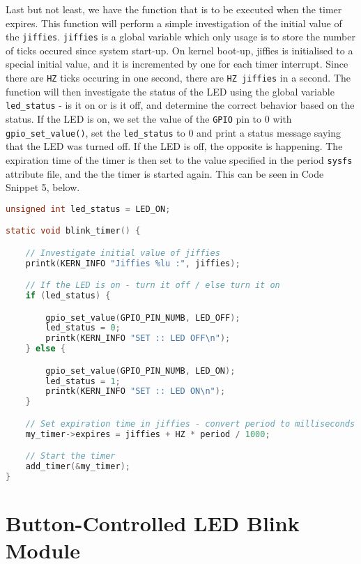 \documentclass[a4paper,oneside,onecolumn]{article}
\newcommand{\code}[1]{\colorbox{codegray}{\texttt{#1}}}
\begin{document}
Last but not least, we have the function that is to be executed when the timer expires. This function will perform a simple investigation of the initial value of the \texttt{jiffies}. \texttt{jiffies} is a global variable which only usage is to store the number of ticks occured since system start-up. On kernel boot-up, jiffies is initialised to a special initial value, and it is incremented by one for each timer interrupt. Since there are \texttt{HZ} ticks occuring in one second, there are \texttt{HZ jiffies} in a second.
\newline
The function will then investigate the status of the LED using the global variable \code{led\_status} - is it on or is it off, and determine the correct behavior based on the status. If the LED is on, we set the value of the \texttt{GPIO} pin to 0 with \code{gpio\_set\_value()}, set the \code{led\_status} to 0 and print a status message saying that the LED was turned off. If the LED is off, the opposite is happening.
\newline
The expiration time of the timer is then set to the value specified in the period \texttt{sysfs} attribute file, and the the timer is started again. This can be seen in Code Snippet 5, below.

\begin{lstlisting}[language=c, label={lst:blink_timer}, caption={The Blink Function to be Executed on Timer End}]
unsigned int led_status = LED_ON;

static void blink_timer() {

    // Investigate initial value of jiffies
    printk(KERN_INFO "Jiffies %lu :", jiffies);

    // If the LED is on - turn it off / else turn it on
    if (led_status) {

        gpio_set_value(GPIO_PIN_NUMB, LED_OFF);
        led_status = 0;
        printk(KERN_INFO "SET :: LED OFF\n");
    } else {

        gpio_set_value(GPIO_PIN_NUMB, LED_ON);
        led_status = 1;
        printk(KERN_INFO "SET :: LED ON\n");
    }

    // Set expiration time in jiffies - convert period to milliseconds
    my_timer->expires = jiffies + HZ * period / 1000;

    // Start the timer
    add_timer(&my_timer);
}
\end{lstlisting}

\section{Button-Controlled LED Blink Module}
\end{document}
